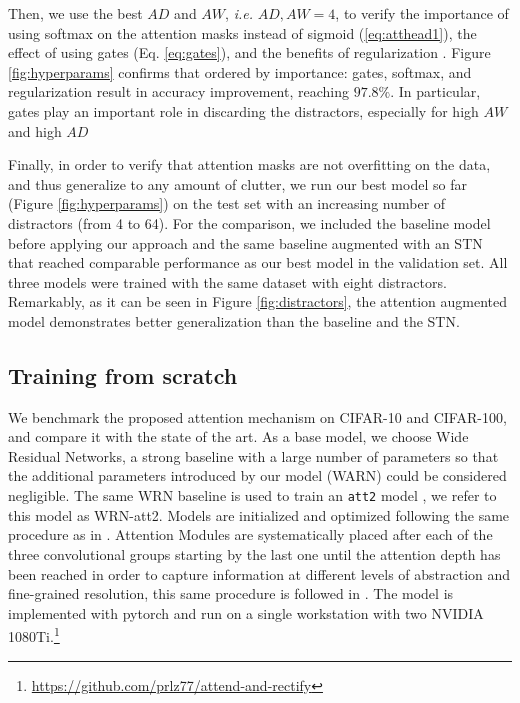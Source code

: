 \documentclass[runningheads]{llncs}
\begin{document}
Then, we use the best $AD$ and $AW$, \emph{i.e.} $AD,AW=4$, to verify the importance of using softmax on the attention masks instead of sigmoid (\ref{eq:atthead1}), the effect of using gates (Eq. \ref{eq:gates}), and the benefits of regularization \cite{zhao2017diversified}. Figure \ref{fig:hyperparams} confirms that ordered by importance: gates, softmax, and regularization result in accuracy improvement, reaching $97.8\%$. In particular, gates play an important role in discarding the distractors, especially for high $AW$ and high $AD$

Finally, in order to verify that attention masks are not overfitting on the data, and thus generalize to any amount of clutter, we run our best model so far (Figure \ref{fig:hyperparams}) on the test set with an increasing number of distractors (from 4 to 64). For the comparison, we included the baseline model before applying our approach and the same baseline augmented with an STN \cite{jaderberg2015spatial} that reached comparable performance as our best model in the validation set. All three models were trained with the same dataset with eight distractors. Remarkably, as it can be seen in Figure \ref{fig:distractors}, the attention augmented model demonstrates better generalization than the baseline and the STN.

\subsection{Training from scratch}
We benchmark the proposed attention mechanism on CIFAR-10 and CIFAR-100, and compare it with the state of the art. As a base model, we choose Wide Residual Networks, a strong baseline with a large number of parameters so that the additional parameters introduced by our model (WARN) could be considered negligible. The same WRN baseline is used to train an \texttt{att2} model \cite{jetley2018learn}, we refer to this model as WRN-att2. Models are initialized and optimized following the same procedure as in \cite{Zagoruyko2016WRN}. Attention Modules are systematically placed after each of the three convolutional groups starting by the last one until the attention depth has been reached in order to capture information at different levels of abstraction and fine-grained resolution, this same procedure is followed in \cite{jetley2018learn}. The model is implemented with pytorch \cite{paszke2017pytorch} and run on a single workstation with two NVIDIA 1080Ti.\footnote{\url{https://github.com/prlz77/attend-and-rectify}}
\end{document}
